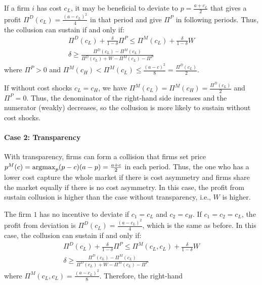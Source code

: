 \documentclass[12pt]{article}
\newcommand{\argmax}{\operatornamewithlimits{argmax}}
\begin{document}
If a firm $i$ has cost $c_L$, it may be beneficial to deviate to $p=\frac{a+c_L}{2}$ that gives a profit $\Pi^D(c_L)=\frac{(a-c_L)^2}{4}$ in that period and give $\Pi^P$ in following periods. Thus, the collusion can sustain if and only if:
\begin{equation}
    \begin{aligned}
        \Pi^D(c_L)+\frac{\delta}{1-\delta}\Pi^P\leq \Pi^M(c_L)+\frac{\delta}{1-\delta}W\\
        \delta\geq\frac{\Pi^D(c_L)-\Pi^M(c_L)}{\Pi^D(c_L)+W-\Pi^M(c_L)-\Pi^P}
        \end{aligned}
        \nonumber
\end{equation}
where $\Pi^P>0$ and $\Pi^M(c_H)<\Pi^M(c_L)\leq\frac{(a-c)^2}{8}=\frac{\Pi^D(c_L)}{2}$.

If without cost shocks $c_L=c_H$, we have $\Pi^M(c_L)=\Pi^M(c_H)=\frac{\Pi^D(c_L)}{2}$ and $\Pi^P=0$. Thus, the denominator of the right-hand side increases and the numerator (weakly) decreases, so the collusion is more likely to sustain without cost shocks.

\paragraph{Case 2: Transparency}
With transparency, firms can form a collision that firms set price $p^M(c)=\argmax_p (p-c)(a-p)=\frac{a+c}{2}$ in each period. Thus, the one who has a lower cost capture the whole market if there is cost asymmetry and firms share the market equally if there is no cost asymmetry. In this case, the profit from sustain collusion is higher than the case without transparency, i.e., $W$ is higher.

The firm $1$ has no incentive to deviate if $c_1=c_L$ and $c_2=c_H$. If $c_1=c_2=c_L$, the profit from deviation is $\Pi^D(c_L)=\frac{(a-c_L)^2}{4}$, which is the same as before. In this case, the collusion can sustain if and only if:
\begin{equation}
    \begin{aligned}
        \Pi^D(c_L)+\frac{\delta}{1-\delta}\Pi^P\leq \Pi^M(c_L,c_L)+\frac{\delta}{1-\delta}W\\
        \delta\geq\frac{\Pi^D(c_L)-\Pi^M(c_L)}{\Pi^D(c_L)+W-\Pi^M(c_L)-\Pi^P}
    \end{aligned}
    \nonumber
\end{equation}
where $\Pi^M(c_L,c_L)=\frac{(a-c_L)^2}{8}$. Therefore, the right-hand 
\end{document}

